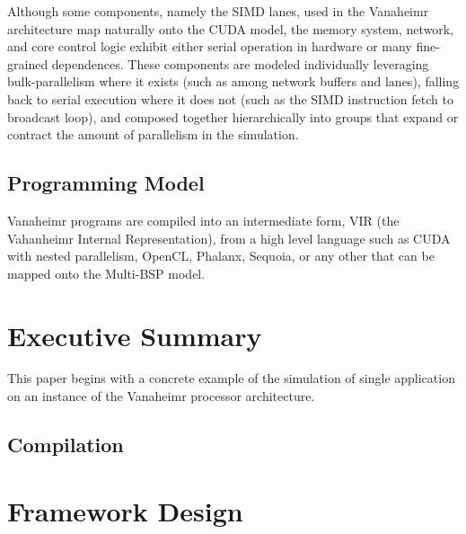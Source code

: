 \documentclass[conference, 10pt]{IEEEtran}
\begin{document}
Although some components, namely the SIMD lanes, used in the Vanaheimr
architecture map naturally onto the CUDA model, the memory system, network,
and core control logic exhibit either serial operation in hardware or many
fine-grained dependences.  These components are modeled individually leveraging
bulk-parallelism where it exists (such as among network buffers and lanes),
falling back to serial execution where it does not (such as the SIMD instruction
fetch to broadcast loop), and composed together hierarchically into groups
that expand or contract the amount of parallelism in the simulation.  

\subsection{Programming Model}
Vanaheimr programs are compiled into an intermediate form, VIR (the Vahanheimr
Internal Representation), from a high level language such as CUDA with nested
parallelism, OpenCL, Phalanx, Sequoia, or any other that can be mapped onto
the Multi-BSP model.  



\section{Executive Summary}
\label{sec:summary}

This paper begins with a concrete example of the simulation of single
application on an instance of the Vanaheimr processor architecture.  

\subsection{Compilation}

\subsection{}


\section{Framework Design}
\label{sec:framework-design}
\end{document}
